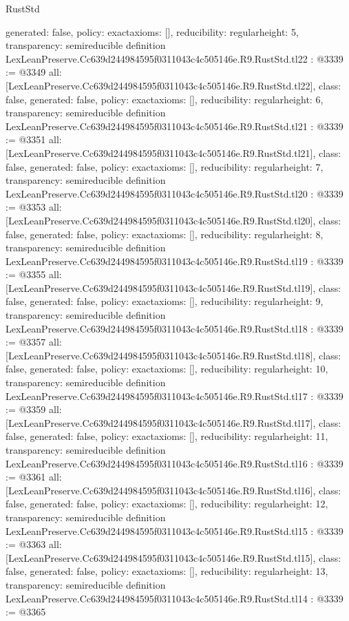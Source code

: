 \begin{lexlean}{RustStd}
\begin{coremodule}
{  generated: false,
  policy: exact{axioms: []},
  reducibility: regular{height: 5},
  transparency: semireducible
}
definition LexLeanPreserve.Cc639d244984595f0311043c4c505146e.R9.RustStd.tl22 : @3339 := @3349 {
  all: [LexLeanPreserve.Cc639d244984595f0311043c4c505146e.R9.RustStd.tl22],
  class: false,
  generated: false,
  policy: exact{axioms: []},
  reducibility: regular{height: 6},
  transparency: semireducible
}
definition LexLeanPreserve.Cc639d244984595f0311043c4c505146e.R9.RustStd.tl21 : @3339 := @3351 {
  all: [LexLeanPreserve.Cc639d244984595f0311043c4c505146e.R9.RustStd.tl21],
  class: false,
  generated: false,
  policy: exact{axioms: []},
  reducibility: regular{height: 7},
  transparency: semireducible
}
definition LexLeanPreserve.Cc639d244984595f0311043c4c505146e.R9.RustStd.tl20 : @3339 := @3353 {
  all: [LexLeanPreserve.Cc639d244984595f0311043c4c505146e.R9.RustStd.tl20],
  class: false,
  generated: false,
  policy: exact{axioms: []},
  reducibility: regular{height: 8},
  transparency: semireducible
}
definition LexLeanPreserve.Cc639d244984595f0311043c4c505146e.R9.RustStd.tl19 : @3339 := @3355 {
  all: [LexLeanPreserve.Cc639d244984595f0311043c4c505146e.R9.RustStd.tl19],
  class: false,
  generated: false,
  policy: exact{axioms: []},
  reducibility: regular{height: 9},
  transparency: semireducible
}
definition LexLeanPreserve.Cc639d244984595f0311043c4c505146e.R9.RustStd.tl18 : @3339 := @3357 {
  all: [LexLeanPreserve.Cc639d244984595f0311043c4c505146e.R9.RustStd.tl18],
  class: false,
  generated: false,
  policy: exact{axioms: []},
  reducibility: regular{height: 10},
  transparency: semireducible
}
definition LexLeanPreserve.Cc639d244984595f0311043c4c505146e.R9.RustStd.tl17 : @3339 := @3359 {
  all: [LexLeanPreserve.Cc639d244984595f0311043c4c505146e.R9.RustStd.tl17],
  class: false,
  generated: false,
  policy: exact{axioms: []},
  reducibility: regular{height: 11},
  transparency: semireducible
}
definition LexLeanPreserve.Cc639d244984595f0311043c4c505146e.R9.RustStd.tl16 : @3339 := @3361 {
  all: [LexLeanPreserve.Cc639d244984595f0311043c4c505146e.R9.RustStd.tl16],
  class: false,
  generated: false,
  policy: exact{axioms: []},
  reducibility: regular{height: 12},
  transparency: semireducible
}
definition LexLeanPreserve.Cc639d244984595f0311043c4c505146e.R9.RustStd.tl15 : @3339 := @3363 {
  all: [LexLeanPreserve.Cc639d244984595f0311043c4c505146e.R9.RustStd.tl15],
  class: false,
  generated: false,
  policy: exact{axioms: []},
  reducibility: regular{height: 13},
  transparency: semireducible
}
definition LexLeanPreserve.Cc639d244984595f0311043c4c505146e.R9.RustStd.tl14 : @3339 := @3365 {
}
\end{coremodule}
\end{lexlean}
